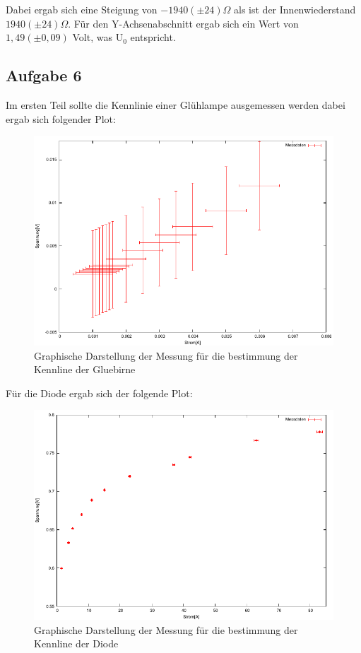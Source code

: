 \documentclass[12pt]{scrartcl}
\begin{document}
Dabei ergab sich eine Steigung von $-1940 (\pm 24)\Omega$ als ist der Innenwiederstand $1940 (\pm 24)\Omega$.
Für den Y-Achsenabschnitt ergab sich ein Wert von $1,49	(\pm 0,09)$ Volt, was U$_0$ entspricht.

\newpage

\subsection{Aufgabe 6}
Im ersten Teil sollte die Kennlinie einer Glühlampe ausgemessen werden dabei ergab sich folgender Plot:

\begin{figure}[htbp] 
	 \centering
	   \includegraphics[scale = 1]{Gluebirne.pdf}
	 	\caption[Graphische Darstellung der Messung für die bestimmung der Kennline der Gluebirne]{Graphische Darstellung der Messung für die bestimmung der Kennline der Gluebirne}
	 \label{fig:aufgabe_6_a_plot}
\end{figure}

Für die Diode ergab sich der folgende Plot:

\begin{figure}[htbp] 
	 \centering
	   \includegraphics[scale = 1]{Diode.pdf}
	 	\caption[Graphische Darstellung der Messung für die bestimmung der Kennline der Diode]{Graphische Darstellung der Messung für die bestimmung der Kennline der Diode}
	 \label{fig:aufgabe_6_a_plot}
\end{figure}
\end{document}
